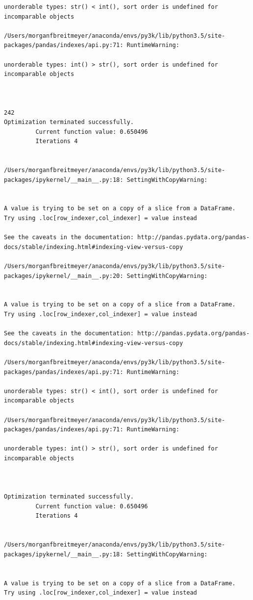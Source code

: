 \begin{lstlisting}
unorderable types: str() < int(), sort order is undefined for incomparable objects

/Users/morganfbreitmeyer/anaconda/envs/py3k/lib/python3.5/site-packages/pandas/indexes/api.py:71: RuntimeWarning:

unorderable types: int() > str(), sort order is undefined for incomparable objects



242
Optimization terminated successfully.
         Current function value: 0.650496
         Iterations 4


/Users/morganfbreitmeyer/anaconda/envs/py3k/lib/python3.5/site-packages/ipykernel/__main__.py:18: SettingWithCopyWarning:


A value is trying to be set on a copy of a slice from a DataFrame.
Try using .loc[row_indexer,col_indexer] = value instead

See the caveats in the documentation: http://pandas.pydata.org/pandas-docs/stable/indexing.html#indexing-view-versus-copy

/Users/morganfbreitmeyer/anaconda/envs/py3k/lib/python3.5/site-packages/ipykernel/__main__.py:20: SettingWithCopyWarning:


A value is trying to be set on a copy of a slice from a DataFrame.
Try using .loc[row_indexer,col_indexer] = value instead

See the caveats in the documentation: http://pandas.pydata.org/pandas-docs/stable/indexing.html#indexing-view-versus-copy

/Users/morganfbreitmeyer/anaconda/envs/py3k/lib/python3.5/site-packages/pandas/indexes/api.py:71: RuntimeWarning:

unorderable types: str() < int(), sort order is undefined for incomparable objects

/Users/morganfbreitmeyer/anaconda/envs/py3k/lib/python3.5/site-packages/pandas/indexes/api.py:71: RuntimeWarning:

unorderable types: int() > str(), sort order is undefined for incomparable objects



Optimization terminated successfully.
         Current function value: 0.650496
         Iterations 4


/Users/morganfbreitmeyer/anaconda/envs/py3k/lib/python3.5/site-packages/ipykernel/__main__.py:18: SettingWithCopyWarning:


A value is trying to be set on a copy of a slice from a DataFrame.
Try using .loc[row_indexer,col_indexer] = value instead


\end{lstlisting}
